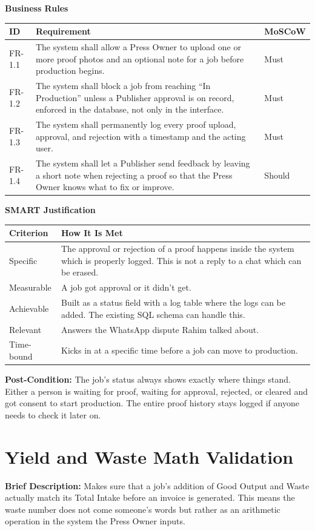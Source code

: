 \documentclass{scrreprt}
\begin{document}
\textbf{Business Rules}
\begin{longtable}{p{} L{0.76\textwidth} p{0.12\textwidth}}
\toprule
{} \textbf{ID} & \textbf{Requirement} & \textbf{MoSCoW} \\
\midrule
\endhead
FR-1.1 & The system shall allow a Press Owner to upload one or more proof photos and an optional note for a job before production begins. & Must \\
FR-1.2 & The system shall block a job from reaching ``In Production'' unless a Publisher approval is on record, enforced in the database, not only in the interface. & Must \\
FR-1.3 & The system shall permanently log every proof upload, approval, and rejection with a timestamp and the acting user. & Must \\
FR-1.4 & The system shall let a Publisher send feedback by leaving a short note when rejecting a proof so that the Press Owner knows what to fix or improve. & Should \\
\bottomrule
\end{longtable}

\textbf{SMART Justification}
\begin{longtable}{p{} L{0.82\textwidth}}
\toprule
{} \textbf{Criterion} & \textbf{How It Is Met} \\
\midrule
\endhead
Specific & The approval or rejection of a proof happens inside the system which is properly logged. This is not a reply to a chat which can be erased. \\
Measurable & A job got approval or it didn't get. \\
Achievable & Built as a status field with a log table where the logs can be added. The existing SQL schema can handle this. \\
Relevant & Answers the WhatsApp dispute Rahim talked about. \\
Time-bound & Kicks in at a specific time before a job can move to production. \\
\bottomrule
\end{longtable}

\textbf{Post-Condition:} The job's status always shows exactly where things stand. Either a person is waiting for proof, waiting for approval, rejected, or cleared and got consent to start production. The entire proof history stays logged if anyone needs to check it later on.

\section{Yield and Waste Math Validation}
\textbf{Brief Description:} Makes sure that a job's addition of Good Output and Waste actually match its Total Intake before an invoice is generated. This means the waste number does not come someone's words but rather as an arithmetic operation in the system the Press Owner inputs.
\end{document}

